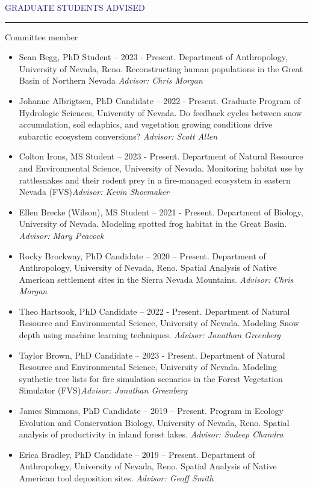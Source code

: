 \documentclass{resume} %
\renewenvironment{rSection}[1]{
\sectionskip
\textcolor{MidnightBlue}{\MakeUppercase{#1}}
\sectionlineskip
\hrule
\begin{list}{}{
\setlength{\leftmargin}{1.5em}
}
\item[]
}{
\end{list}
}
\begin{document}
\begin{rSection}{Graduate Students Advised}
\begin{rSubsection}{Committee member}{}{}{}
\begin{itemize}
\item[] Sean Begg, PhD Student – 2023 - Present. Department of Anthropology, University of Nevada, Reno. Reconstructing human populations in the Great Basin of Northern Nevada \textit{Advisor: Chris Morgan}

\item[] Johanne Albrigtsen, PhD Candidate – 2022 - Present. Graduate Program of Hydrologic Sciences, University of Nevada.  Do feedback cycles between snow accumulation, soil edaphics, and vegetation growing conditions drive subarctic ecosystem conversions? \textit{Advisor: Scott Allen}

\item[] Colton Irons, MS Student – 2023 - Present. Department of Natural Resource and Environmental Science, University of Nevada. Monitoring habitat use by rattlesnakes and their rodent prey in a fire-managed ecosystem in eastern Nevada  (FVS)\textit{Advisor: Kevin Shoemaker}

\item[] Ellen Brecke (Wilson), MS Student – 2021 - Present. Department of Biology, University of Nevada. Modeling spotted frog habitat in the Great Basin. \textit{Advisor: Mary Peacock}
 
 \item[] Rocky Brockway, PhD Candidate – 2020 – Present. Department of Anthropology, University of Nevada, Reno. Spatial Analysis of Native American settlement sites in the Sierra Nevada Mountains. \textit{Advisor: Chris Morgan}

\item[] Theo Hartsook, PhD Candidate – 2022 - Present. Department of Natural Resource and Environmental Science, University of Nevada. Modeling Snow depth using machine learning techniques. \textit{Advisor: Jonathan Greenberg}

\item[] Taylor Brown, PhD Candidate – 2023 - Present. Department of Natural Resource and Environmental Science, University of Nevada. Modeling synthetic tree lists for fire simulation scenarios in the Forest Vegetation Simulator (FVS)\textit{Advisor: Jonathan Greenberg}

 \item[] James Simmons, PhD Candidate – 2019 – Present. Program in Ecology Evolution and Conservation Biology, University of Nevada, Reno. Spatial analysis of productivity in inland forest lakes. \textit{Advisor: Sudeep Chandra}
 
  \item[] Erica Bradley, PhD Candidate – 2019 – Present. Department of Anthropology, University of Nevada, Reno. Spatial Analysis of Native American tool deposition sites. \textit{Advisor: Geoff Smith}


\end{itemize}
\end{rSubsection}
\end{rSection}
\end{document}
